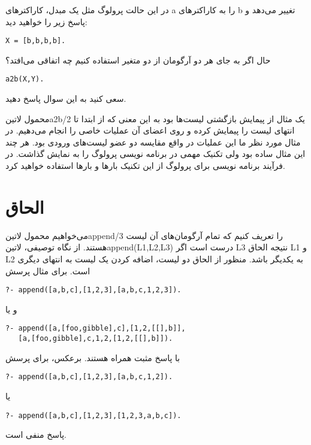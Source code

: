 در این حالت پرولوگ مثل یک مبدل، کاراکترهای a را به کاراکترهای b تغییر می‌دهد و پاسخ زیر را خواهید دید:

\begin{latin}
\begin{lstlisting}
X = [b,b,b,b].
\end{lstlisting}
\end{latin}

حال اگر به جای هر دو آرگومان از دو متغیر استفاده کنیم چه اتفاقی می‌افتد؟

\begin{latin}
\begin{lstlisting}
a2b(X,Y).
\end{lstlisting}
\end{latin}

سعی کنید به این سوال پاسخ دهید.

محمول ‌لاتین{a2b/2} یک مثال از پیمایش بازگشتی لیست‌ها بود به این معنی که از ابتدا تا انتهای لیست را پیمایش کرده و روی اعضای آن عملیات خاصی را انجام می‌دهیم. در مثال مورد نظر ما این عملیات در واقع مقایسه دو عضو لیست‌های ورودی بود. هر چند این مثال ساده بود ولی تکنیک مهمی در برنامه نویسی پرولوگ را به نمایش گذاشت. در فرآیند برنامه نویسی برای پرولوگ از این تکنیک بارها و بارها استفاده خواهید کرد.

\section{الحاق}

می‌خواهیم محمول ‌لاتین{append/3} را تعریف کنیم که تمام آرگومان‌های آن لیست هستند. از نگاه توصیفی، ‌لاتین{append(L1,L2,L3)} درست است اگر L3 نتیجه الحاق L1 و L2 به یکدیگر باشد. منظور از الحاق دو لیست، اضافه کردن یک لیست به انتهای دیگری است. برای مثال پرسش
\begin{latin}
\begin{lstlisting}
?- append([a,b,c],[1,2,3],[a,b,c,1,2,3]).
\end{lstlisting}
\end{latin}
و یا
\begin{latin}
\begin{lstlisting}
?- append([a,[foo,gibble],c],[1,2,[[],b]],
   [a,[foo,gibble],c,1,2,[1,2,[[],b]]).
\end{lstlisting}
\end{latin}
با پاسخ مثبت همراه هستند. برعکس، برای پرسش
\begin{latin}
\begin{lstlisting}
?- append([a,b,c],[1,2,3],[a,b,c,1,2]).
\end{lstlisting}
\end{latin}
یا
\begin{latin}
\begin{lstlisting}
?- append([a,b,c],[1,2,3],[1,2,3,a,b,c]).
\end{lstlisting}
\end{latin}
پاسخ منفی است.

